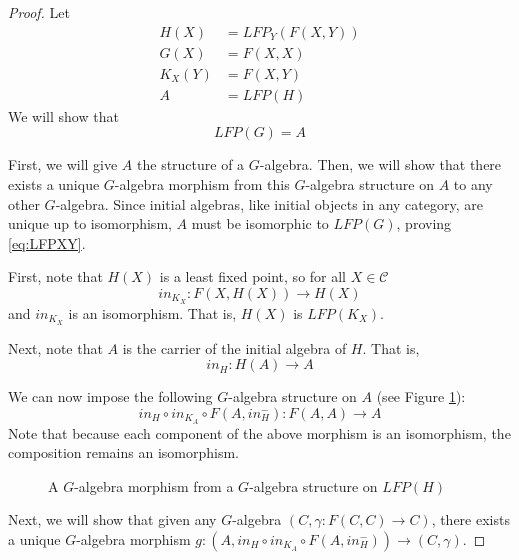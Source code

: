 \documentclass{msthesis}
\theoremstyle{definition}
\newcommand{\mcC}{\mathcal{C}}
\begin{document}
\begin{proof}
    Let
    \begin{align*}
        H(X) &= LFP_Y(F(X, Y)) \\
        G(X) &= F(X,X) \\
        K_X(Y) &= F(X,Y) \\
        A &= LFP(H)
    \end{align*}
    We will show that 
    \[ LFP(G) = A \]

    First, we will give $A$ the structure of a $G$-algebra.  Then, we will show that there exists a unique $G$-algebra morphism from this $G$-algebra structure on $A$ to any other $G$-algebra.  Since initial algebras, like initial objects in any category, are unique up to isomorphism, $A$ must be isomorphic to $LFP(G)$, proving \eqref{eq:LFPXY}.

    First, note that $H(X)$ is a least fixed point, so for all $X \in \mcC$
    \[ in_{K_X} : F(X, H(X)) \to H(X) \]
    and $in_{K_X}$ is an isomorphism.
    That is, $H(X)$ is $LFP(K_X)$.

    Next, note that $A$ is the carrier of the initial algebra of $H$. That is,
    \[ in_H : H(A) \to A\]

    We can now impose the following $G$-algebra structure on $A$ (see Figure \ref{fig:fxxalgmorphism}):
    \[ in_H \circ in_{K_{A}} \circ F(A, in^-_H) : F(A, A) \to A \]
    Note that because each component of the above morphism is an isomorphism, the composition remains an isomorphism.

    \begin{figure}
        \centering
        {
        }
        \caption{A $G$-algebra morphism from a $G$-algebra structure on $LFP(H)$}
        \label{fig:fxxalgmorphism}
    \end{figure}

    Next, we will show that given any $G$-algebra $(C, \gamma : F(C, C) \to C)$, there exists a unique $G$-algebra morphism $g : (A, in_H \circ in_{K_{A}} \circ F(A, in^-_H)) \to (C, \gamma)$.


\end{proof}
\end{document}
